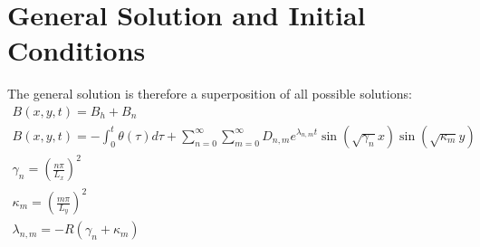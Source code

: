 \documentclass[11pt]{article}
\begin{document}
\section{General Solution and Initial Conditions}
The general solution is therefore a superposition of all possible solutions:
\begin{equation}\begin{aligned}
B(x,y,t) = B_h + B_n \\
B(x,y,t) = - \int_0^t \theta(\tau) d\tau +
\sum_{n=0}^{\infty} \sum_{m=0}^{\infty}
D_{n,m} e^{\lambda_{n,m} t} \sin(\sqrt{\gamma_n} x) \sin(\sqrt{\kappa_{m}} y)
 \\
 \gamma_n = \left( \frac{n\pi}{L_x} \right)^2 \\
 \kappa_{m} = \left( \frac{m\pi}{L_y} \right)^2 \\
 \lambda_{n,m} = - R \left( \gamma_n + \kappa_{m} \right) \\
\end{aligned} \end{equation}
\end{document}
